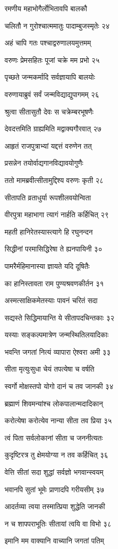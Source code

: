 रमणीय महाभोगैर्लोभितावपि बालकौ

चलितौ न गुरोश्चात्ममातुः पादाम्बुजस्मृतेः २४

अहं चापि गतः पश्चाद्वरुणालयमुत्तमम्

वरुणः प्रेमसहितः पूजां चक्रे मम प्रभो २५

पृच्छते जन्मकर्मादि सर्वज्ञायापि बालयोः

वरुणायाब्रुवं सर्वं जन्मविद्याद्युपागमम् २६

श्रुत्वा सीतासुतौ देवः स चक्रेम्बरभूषणैः

देवदत्तमिति ग्राह्यमिति मद्वाक्यगौरवात् २७

आहृतं राजपुत्राभ्यां यद्दत्तं वरुणेन तत्

प्रसन्नेन तयोर्वाद्यगानविद्यावयोगुणैः

ततो मामब्रवीत्सीतामुद्दिश्य वरुणः कृती २८

सीतापति व्रताधुर्या रूपशीलवयोन्विता

वीरपुत्रा महाभागा त्यागं नार्हति कर्हिचित् २९

महती हानिरेतस्यास्त्यागे हि रघुनन्दन

सिद्धीनां परमासिद्धिरेषा ते ह्यनपायिनी ३०

पामरैर्महिमानास्या ज्ञायते यदि दूषितैः

का हानिस्तावता राम पुण्यश्रवणकीर्तन ३१

अस्मत्साक्षिकमेतस्याः पावनं चरितं सदा

सद्यस्ते सिद्धिमायान्ति ये सीतापदचिन्तकाः ३२

यस्याः सङ्कल्पमात्रेण जन्मस्थितिलयादिकाः

भवन्ति जगतां नित्यं व्यापारा ऐश्वरा अमी ३३

सीता मृत्युःसुधा चेयं तपत्येषा च वर्षति

स्वर्गो मोक्षस्तपो योगो दानं च तव जानकी ३४

ब्रह्माणं शिवमन्यांश्च लोकपालान्मदादिकान्

करोत्येषा करोत्येव नान्या सीता तव प्रिया ३५

त्वं पिता सर्वलोकानां सीता च जननीत्यतः

कुदृष्टिरत्र तु क्षेमयोग्या न तव कर्हिचित् ३६

वेत्ति सीतां सदा शुद्धां सर्वज्ञो भगवान्स्वयम्

भवानपि सुतां भूमेः प्राणादपि गरीयसीम् ३७

आदर्तव्या त्वया तस्मात्प्रिया शुद्धेति जानकी

न च शापपराभूतिः सीतायां त्वयि वा विभो ३८

इमानि मम वाक्यानि वाच्यानि जगतां पतिम्

